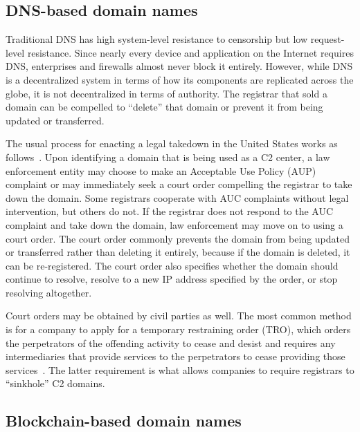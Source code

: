 \documentclass[10pt,sigconf,letterpaper]{acmart}
\begin{document}
\subsection{DNS-based domain names}

Traditional DNS has high system-level resistance to censorship but low request-level resistance. 
Since 
nearly every device and application on the Internet requires DNS, enterprises and firewalls almost 
never block it entirely. However, while DNS is a decentralized system in terms of how its 
components 
are replicated across the globe, it is not decentralized in terms of authority. The registrar 
that sold a domain can be compelled to ``delete'' that domain or prevent it from being updated or 
transferred. 

The usual process for enacting a legal takedown in the United States works as 
follows~\cite{knight_domain_2015}. Upon 
identifying a domain that is being used as a C2 center, a law enforcement entity may choose to make 
an Acceptable Use Policy (AUP) complaint or may immediately seek a court order compelling the 
registrar to take down the domain. Some registrars cooperate with AUC complaints without legal 
intervention, but others do not. If the registrar does not respond to the AUC complaint and take 
down the domain, law enforcement may move on to using a court order. The court order commonly 
prevents the domain from being updated or transferred rather than deleting it entirely, because if 
the domain is deleted, it can be re-registered. The court order also specifies whether the domain 
should continue to resolve, resolve to a new IP address specified by the order, or stop resolving 
altogether. 

Court orders may be obtained by civil parties as well. The most common method is for a company to 
apply for a temporary restraining order (TRO), which orders the perpetrators of the offending 
activity to cease and desist and requires any intermediaries that provide services to the 
perpetrators to cease providing those services~\cite{kesari_deterring_2017}. The latter requirement 
is what allows companies to require registrars to ``sinkhole'' C2 domains. 

\subsection{Blockchain-based domain names}
\end{document}
